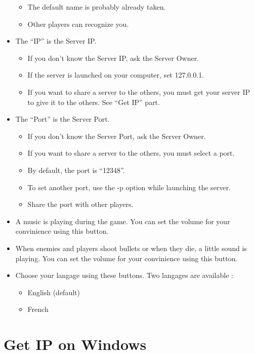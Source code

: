 \documentclass{koala-fr}
\begin{document}
\begin{itemize}
    \begin{itemize}
      \item The default name is probably already taken.
      \item Other players can recognize you.
    \end{itemize}
  \item The ``IP'' is the Server IP.
    \begin{itemize}
      \item If you don't know the Server IP, ask the Server Owner.
      \item If the server is launched on your computer, set 127.0.0.1.
      \item If you want to share a server to the others, you must get your server IP to give it to the others. See ``Get IP'' part.
    \end{itemize}
  \item The ``Port'' is the Server Port.
    \begin{itemize}
      \item If you don't know the Server Port, ask the Server Owner.
      \item If you want to share a server to the others, you must select a port.
      \item By default, the port is ``12348''.
      \item To set another port, use the -p option while launching the server.
      \item Share the port with other players.
    \end{itemize}
  \item A music is playing during the game. You can set the volume for your convinience using this button.
  \item When enemies and players shoot bullets or when they die, a little sound is playing. You can set the volume for your convinience using this button.
  \item Choose your langage using these buttons. Two langages are available :
    \begin{itemize}
      \item English (default)
      \item French
    \end{itemize}
\end{itemize}

\section{Get IP on Windows}
\end{document}
